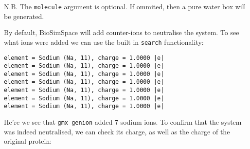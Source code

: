 \begin{Shaded}
\begin{Highlighting}[]
\OperatorTok{=}\OperatorTok{=}\OperatorTok{=}\OperatorTok{*}
\end{Highlighting}
\end{Shaded}

N.B. The \texttt{molecule} argument is optional. If ommited, then a pure
water box will be generated.

By default, BioSimSpace will add counter-ions to neutralise the system.
To see what ions were added we can use the built in \texttt{search}
functionality:

\begin{Shaded}
\begin{Highlighting}[]
\OperatorTok{=}\NormalTok{)}

    \NormalTok{(}\SpecialCharTok{\{}\SpecialCharTok{\}}\SpecialCharTok{\{}\SpecialCharTok{\}}\NormalTok{)}
\end{Highlighting}
\end{Shaded}

\begin{verbatim}
element = Sodium (Na, 11), charge = 1.0000 |e|
element = Sodium (Na, 11), charge = 1.0000 |e|
element = Sodium (Na, 11), charge = 1.0000 |e|
element = Sodium (Na, 11), charge = 1.0000 |e|
element = Sodium (Na, 11), charge = 1.0000 |e|
element = Sodium (Na, 11), charge = 1.0000 |e|
element = Sodium (Na, 11), charge = 1.0000 |e|
\end{verbatim}

He're we see that \texttt{gmx\ genion} added 7 sodium ions. To confirm
that the system was indeed neutralised, we can check its charge, as well
as the charge of the original protein:

\begin{Shaded}
\begin{Highlighting}[]
\NormalTok{(}\SpecialCharTok{\{}\SpecialCharTok{\}}\SpecialCharTok{\{}\SpecialCharTok{\}}\NormalTok{)}
\end{Highlighting}
\end{Shaded}


